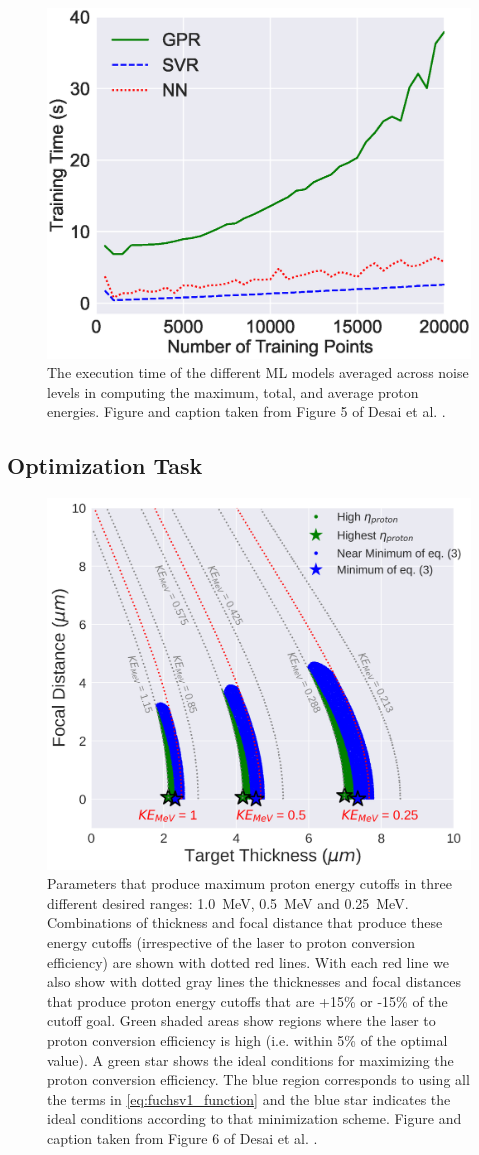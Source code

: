 \begin{figure}
	\centering 
	\includegraphics[width=0.6\linewidth]{planning/images/paper1/time.eps}
	\caption{The execution time of the different ML models averaged across noise levels in computing the maximum, total, and average proton energies. Figure and caption taken from Figure 5 of Desai et al. \cite{Desai_2024_CPP}.}
	\label{fig:execution_time}
\end{figure}

\subsection{Optimization Task}
\begin{figure}
	\centering 
	\includegraphics[width=0.65\linewidth]{planning/images/paper1/fuchs_optim.pdf}
	\caption{Parameters that produce maximum proton energy cutoffs in three different desired ranges: 1.0~MeV, 0.5~MeV and 0.25~MeV. Combinations of thickness and focal distance that produce these energy cutoffs (irrespective of the laser to proton conversion efficiency) are shown with dotted red lines. With each red line we also show with dotted gray lines the thicknesses and focal distances that produce proton energy cutoffs that are +15\% or -15\% of the cutoff goal. Green shaded areas show regions where the laser to proton conversion efficiency is high (i.e. within 5\% of the optimal value). A green star shows the ideal conditions for maximizing the proton conversion efficiency. The blue region corresponds to using all the terms in \autoref{eq:fuchsv1_function} and the blue star indicates the ideal conditions according to that minimization scheme. Figure and caption taken from Figure 6 of Desai et al. \cite{Desai_2024_CPP}.}
	\label{fig:banana}
\end{figure}

